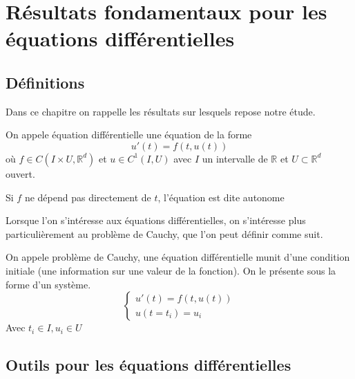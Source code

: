 \documentclass{article}
\newcommand{\R}{\mathbb{R}}
\newtheorem[M , nocut]{prop}{Proposition}[section]
\newtheorem[M , nocut]{definition}{Définition}
\newtheorem[M , nocut]{lemme}{Lemme}
\newtheorem[L , nocut]{thm}{Théoreme}
\newtheorem[M , nocut]{cor}{Corollaire}
\begin{document}
\newpage
\section{Résultats fondamentaux pour les équations différentielles}

\subsection{Définitions}
Dans ce chapitre on rappelle les résultats sur lesquels repose notre étude.
\begin{definition}
    On appele équation différentielle une équation de la forme
    \[
      u'(t) = f(t,u(t))  
    \]où $f \in C(I\times U,\R^d)$ et $u \in C^1(I,U)$ avec $I$ un intervalle de $\R$ et $U \subset \R^d$ ouvert.
\end{definition}
\begin{example}[Remarque]
    Si $f$ ne dépend pas directement de $t$, l'équation est dite autonome
\end{example}
Lorsque l'on s'intéresse aux équations différentielles, on s'intéresse plus particulièrement au problème de Cauchy, que l'on peut définir comme suit.
\begin{definition}
    On appele problème de Cauchy, une équation différentielle munit d'une condition initiale (une information sur une valeur de la fonction). On le présente sous la forme d'un système.
    \[ \left\{ \begin{array}{l}
        u'(t) = f(t,u(t)) \\ 
        u(t=t_i) = u_i
    \end{array}\right. \]
    Avec $t_i\in I, u_i \in U$
\end{definition}

\subsection{Outils pour les équations différentielles}
\end{document}
